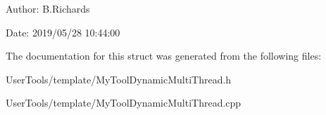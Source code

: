 \begin{DoxyParagraph}{Author\-:}
B.\-Richards 
\end{DoxyParagraph}
\begin{DoxyParagraph}{Date\-:}
2019/05/28 10\-:44\-:00 
\end{DoxyParagraph}


The documentation for this struct was generated from the following files\-:\begin{DoxyCompactItemize}
\item 
User\-Tools/template/My\-Tool\-Dynamic\-Multi\-Thread.\-h\item 
User\-Tools/template/My\-Tool\-Dynamic\-Multi\-Thread.\-cpp\end{DoxyCompactItemize}
